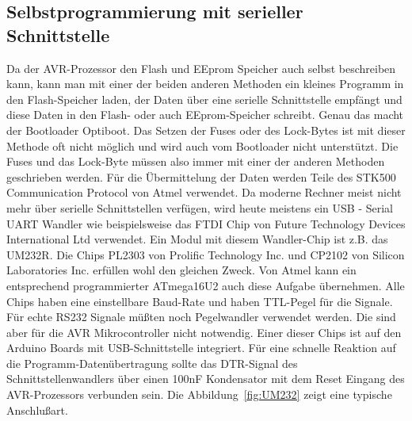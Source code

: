 \subsection{Selbstprogrammierung mit serieller Schnittstelle}

Da der AVR-Prozessor den Flash und EEprom Speicher auch selbst beschreiben kann, kann man
mit einer der beiden anderen Methoden ein kleines Programm in den Flash-Speicher laden,
der Daten über eine serielle Schnittstelle empfängt und diese Daten in den Flash- oder
auch EEprom-Speicher schreibt. Genau das macht der Bootloader Optiboot.
Das Setzen der Fuses oder des Lock-Bytes ist mit dieser Methode oft nicht möglich und
wird auch vom Bootloader nicht unterstützt. Die Fuses und das Lock-Byte müssen also
immer mit einer der anderen Methoden geschrieben werden.
Für die Übermittelung der Daten werden Teile des STK500 Communication Protocol von Atmel verwendet.
Da moderne Rechner meist nicht mehr über serielle Schnittstellen verfügen, wird heute 
meistens ein USB - Serial UART Wandler wie beispielsweise das FTDI Chip von Future Technology Devices
International Ltd verwendet. Ein Modul mit diesem Wandler-Chip ist z.B. das UM232R.
Die Chips PL2303 von Prolific Technology Inc. und CP2102 von Silicon Laboratories Inc. 
erfüllen wohl den gleichen Zweck.
Von Atmel kann ein entsprechend programmierter ATmega16U2 auch
diese Aufgabe übernehmen. 
Alle Chips haben eine einstellbare Baud-Rate und haben TTL-Pegel für die Signale.
Für echte RS232 Signale müßten noch Pegelwandler verwendet werden.
Die sind aber für die AVR Mikrocontroller nicht notwendig.
Einer dieser Chips ist auf den Arduino Boards mit USB-Schnittstelle integriert.
Für eine schnelle Reaktion auf die Programm-Datenübertragung sollte das DTR-Signal des
Schnittstellenwandlers über einen 100nF Kondensator mit dem Reset Eingang des AVR-Prozessors
verbunden sein. Die Abbildung~\ref{fig:UM232} zeigt eine typische Anschlußart.

